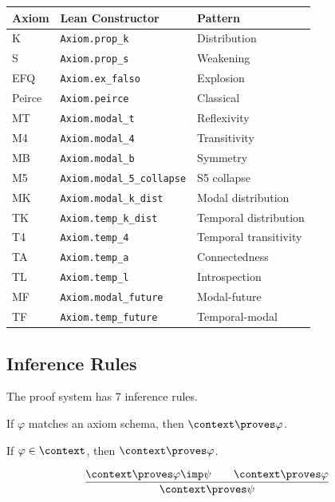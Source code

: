 \documentclass[../BimodalReference.tex]{subfiles}
\begin{document}
\begin{center}
\begin{tabular}{@{}lll@{}}
\toprule
Axiom & Lean Constructor & Pattern \\
\midrule
K & \texttt{Axiom.prop\_k} & Distribution \\
S & \texttt{Axiom.prop\_s} & Weakening \\
EFQ & \texttt{Axiom.ex\_falso} & Explosion \\
Peirce & \texttt{Axiom.peirce} & Classical \\
MT & \texttt{Axiom.modal\_t} & Reflexivity \\
M4 & \texttt{Axiom.modal\_4} & Transitivity \\
MB & \texttt{Axiom.modal\_b} & Symmetry \\
M5 & \texttt{Axiom.modal\_5\_collapse} & S5 collapse \\
MK & \texttt{Axiom.modal\_k\_dist} & Modal distribution \\
TK & \texttt{Axiom.temp\_k\_dist} & Temporal distribution \\
T4 & \texttt{Axiom.temp\_4} & Temporal transitivity \\
TA & \texttt{Axiom.temp\_a} & Connectedness \\
TL & \texttt{Axiom.temp\_l} & Introspection \\
MF & \texttt{Axiom.modal\_future} & Modal-future \\
TF & \texttt{Axiom.temp\_future} & Temporal-modal \\
\bottomrule
\end{tabular}
\end{center}

\subsection{Inference Rules}

The proof system has 7 inference rules.

\begin{definition}
If $\varphi$ matches an axiom schema, then $\context \proves \varphi$.
\end{definition}

\begin{definition}
If $\varphi \in \context$, then $\context \proves \varphi$.
\end{definition}

\begin{definition}
\[
\frac{\context \proves \varphi \imp \psi \qquad \context \proves \varphi}{\context \proves \psi}
\]
\end{definition}
\end{document}
